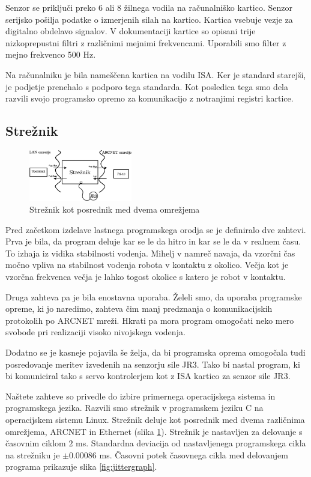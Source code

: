 \documentclass[a4paper]{article}
\begin{document}
Senzor se priključi preko 6 ali 8 žilnega vodila na računalniško kartico. Senzor serijsko pošilja podatke o izmerjenih silah na kartico. Kartica vsebuje vezje za digitalno obdelavo signalov. V dokumentaciji kartice \cite{jr3_doc_inst} so opisani trije nizkoprepustni filtri z različnimi mejnimi frekvencami. Uporabili smo filter z mejno frekvenco 500 Hz.

Na računalniku je bila nameščena kartica na vodilu ISA. Ker je standard starejši, je podjetje prenehalo s podporo tega standarda. Kot posledica tega smo dela razvili svojo programsko opremo za komunikacijo z notranjimi registri kartice.

\subsection{Strežnik} \label{sec:streznik}

\begin{figure}[!t]
	\centering
	\includegraphics[width=0.4\textwidth]{./slike/udp-arcnet-server.eps}
	\caption{Strežnik kot posrednik med dvema omrežjema}
	\label{fig:server}
\end{figure}

Pred začetkom izdelave lastnega programskega orodja se je definiralo dve zahtevi. Prva je bila, da program deluje kar se le da hitro in kar se le da v realnem času. To izhaja iz vidika stabilnosti vodenja. Mihelj v \cite{mihelj_hapt} namreč navaja, da vzorčni čas močno vpliva na stabilnost vodenja robota v kontaktu z okolico. Večja kot je vzorčna frekvenca večja je lahko togost okolice s katero je robot v kontaktu.

Druga zahteva pa je bila enostavna uporaba. Želeli smo, da uporaba programske opreme, ki jo naredimo, zahteva čim manj predznanja o komunikacijskih protokolih po ARCNET mreži. Hkrati pa mora program omogoča\-ti neko mero svobode pri realizaciji visoko nivojskega vodenja.

Dodatno se je kasneje pojavila še želja, da bi programska oprema omogočala tudi posredovanje meritev izvedenih na senzorju sile JR3. Tako bi nastal program, ki bi komuniciral tako s servo kontrolerjem kot z ISA kartico za senzor sile JR3.

Naštete zahteve so privedle do izbire primernega operacijskega sistema in programskega jezika. Razvili smo strežnik v programskem jeziku C na operacijskem sistemu Linux. Strežnik deluje kot posrednik med dvema različnima omrežjema, ARCNET in Ethernet (slika \ref{fig:server}). Stre\-žnik je nastavljen za delovanje s časovnim ciklom $2$ ms. Standardna deviacija od nastavljenega programskega cikla na strežniku je  $\pm 0.00086 $ ms. Časovni potek časovnega cikla med delovanjem programa prikazuje slika \ref{fig:jittergraph}.
\end{document}

